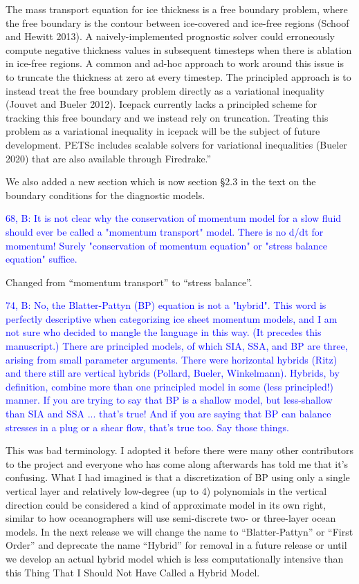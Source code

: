 \documentclass{article}
\theoremstyle{definition}
\theoremstyle{plain}
\begin{document}
The mass transport equation for ice thickness is a free boundary problem, where the free boundary is the contour between ice-covered and ice-free regions (Schoof and Hewitt 2013).
A naively-implemented prognostic solver could erroneously compute negative thickness values in subsequent timesteps when there is ablation in ice-free regions.
A common and ad-hoc approach to work around this issue is to truncate the thickness at zero at every timestep.
The principled approach is to instead treat the free boundary problem directly as a variational inequality (Jouvet and Bueler 2012).
Icepack currently lacks a principled scheme for tracking this free boundary and we instead rely on truncation.
Treating this problem as a variational inequality in icepack will be the subject of future development.
PETSc includes scalable solvers for variational inequalities (Bueler 2020) that are also available through Firedrake.''

We also added a new section which is now section \S2.3 in the text on the boundary conditions for the diagnostic models.

\textcolor{blue}{68, B:  It is not clear why the conservation of momentum model for a slow fluid should ever be called a "momentum transport" model.  There is no d/dt for momentum!  Surely "conservation of momentum equation" or "stress balance equation" suffice.}

Changed from ``momentum transport'' to ``stress balance''.

\textcolor{blue}{74, B:  No, the Blatter-Pattyn (BP) equation is not a "hybrid".  This word is perfectly descriptive when categorizing ice sheet momentum models, and I am not sure who decided to mangle the language in this way.  (It precedes this manuscript.)  There are principled models, of which SIA, SSA, and BP are three, arising from small parameter arguments.  There were horizontal hybrids (Ritz) and there still are vertical hybrids (Pollard, Bueler, Winkelmann).  Hybrids, by definition, combine more than one principled model in some (less principled!) manner.  If you are trying to say that BP is a shallow model, but less-shallow than SIA and SSA ... that's true!  And if you are saying that BP can balance stresses in a plug or a shear flow, that's true too.  Say those things.}

This was bad terminology.
I adopted it before there were many other contributors to the project and everyone who has come along afterwards has told me that it's confusing.
What I had imagined is that a discretization of BP using only a single vertical layer and relatively low-degree (up to 4) polynomials in the vertical direction could be considered a kind of approximate model in its own right, similar to how oceanographers will use semi-discrete two- or three-layer ocean models.
In the next release we will change the name to ``Blatter-Pattyn'' or ``First Order'' and deprecate the name ``Hybrid'' for removal in a future release or until we develop an actual hybrid model which is less computationally intensive than this Thing That I Should Not Have Called a Hybrid Model.
\end{document}
